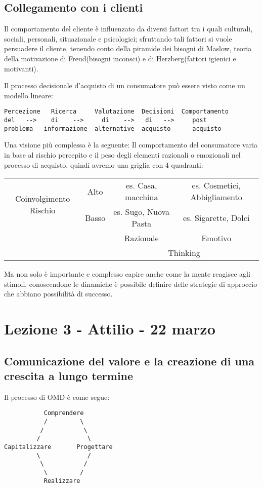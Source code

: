 \documentclass[11pt]{article}
\begin{document}
\subsection{Collegamento con i clienti}
Il comportamento del cliente è influenzato da diversi fattori tra i quali culturali, sociali, personali, situazionale e psicologici; sfruttando tali fattori si vuole persuadere il cliente, tenendo conto della piramide dei bisogni di Maslow, teoria della motivazione di Freud(bisogni inconsci) e di Herzberg(fattori igienici e motivanti).

Il processo decisionale d'acquisto di un consumatore può essere visto come un modello lineare:
\begin{verbatim}
Percezione   Ricerca     Valutazione  Decisioni  Comportamento
del   -->    di    -->     di    -->   di   -->     post
problema   informazione  alternative  acquisto      acquisto
\end{verbatim}

Una visione più complessa è la seguente: Il comportamento del consumatore varia in base al rischio percepito e il peso degli elementi razionali o emozionali nel processo di acquisto, quindi avremo una griglia con 4 quadranti:
\begin{table}
	\centering
	\begin{tabular}{|c|c|c|c|}
		\hline
		\multirow{2}{*}{Coinvolgimento Rischio}& Alto & es. Casa, macchina & es. Cosmetici, Abbigliamento\\ \cline{2-4}
											   & Basso & es. Sugo, Nuova Pasta & es. Sigarette, Dolci\\ \hline
											   & & Razionale & Emotivo\\ \cline{3-4}
											   & & \multicolumn{2}{c|}{Thinking}\\ \hline                                
	\end{tabular}
\end{table}
Ma non solo è importante e complesso capire anche come la mente reagisce agli stimoli, conoscendone le dinamiche è possibile definire delle strategie di approccio che abbiano possibilità di successo.

\section{Lezione 3 - Attilio - 22 marzo}

\subsection{Comunicazione del valore e la creazione di una crescita a lungo termine}
Il processo di OMD è come segue:
\begin{verbatim}
           Comprendere
           /         \
          /           \
         /             \ 
Capitalizzare       Progettare
         \             /
          \           /
           \         /
           Realizzare
\end{verbatim}
\end{document}
